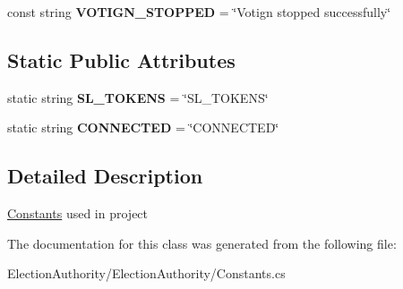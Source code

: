 \begin{DoxyCompactItemize}
\item 
\hypertarget{class_election_authority_1_1_constants_a9463bef5fc5136576053ac1fb2f65562}{}const string {\bfseries V\+O\+T\+I\+G\+N\+\_\+\+S\+T\+O\+P\+P\+E\+D} = \char`\"{}Votign stopped successfully\char`\"{}\label{class_election_authority_1_1_constants_a9463bef5fc5136576053ac1fb2f65562}

\end{DoxyCompactItemize}
\subsection*{Static Public Attributes}
\begin{DoxyCompactItemize}
\item 
\hypertarget{class_election_authority_1_1_constants_a3e962b4f557169f4e820068b09e22e9e}{}static string {\bfseries S\+L\+\_\+\+T\+O\+K\+E\+N\+S} = \char`\"{}S\+L\+\_\+\+T\+O\+K\+E\+N\+S\char`\"{}\label{class_election_authority_1_1_constants_a3e962b4f557169f4e820068b09e22e9e}

\item 
\hypertarget{class_election_authority_1_1_constants_ac97e24a23c3a18d048d2695e0a593394}{}static string {\bfseries C\+O\+N\+N\+E\+C\+T\+E\+D} = \char`\"{}C\+O\+N\+N\+E\+C\+T\+E\+D\char`\"{}\label{class_election_authority_1_1_constants_ac97e24a23c3a18d048d2695e0a593394}

\end{DoxyCompactItemize}


\subsection{Detailed Description}
\hyperlink{class_election_authority_1_1_constants}{Constants} used in project 



The documentation for this class was generated from the following file\+:\begin{DoxyCompactItemize}
\item 
Election\+Authority/\+Election\+Authority/Constants.\+cs\end{DoxyCompactItemize}
